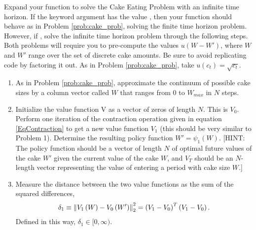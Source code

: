 \begin{problem}
Expand your  function to solve the Cake Eating Problem with an infinite time horizon. If the keyword argument
 has the value , then your function should behave as in Problem \ref{prob:cake_prob}, solving the finite
time horizon problem. However, if , solve the infinite time horizon problem through the following steps.
Both problems will require you to pre-compute the values $u(W - W')$, where $W$ and $W'$ range over the set of discrete cake
amounts. Be sure to avoid replicating code by factoring it out.
As in Problem \ref{prob:cake_prob}, take $u(c_t) = \sqrt{c_t}$.
\begin{enumerate}
\item As in Problem \ref{prob:cake_prob}, approximate the continuum of possible
cake sizes by a column vector called $W$ that ranges from 0 to $W_{max}$ in $N$ steps.

\item \label{item:step2} Initialize the value function V as a vector of zeros of length $N$.  This is $V_0$.  Perform one iteration
of the contraction operation given in equation \eqref{EqContraction} to get a new value function $V_1$ (this should be very similar
to Problem 1).  Determine the resulting policy function $W' = \psi_1\left(W\right)$.  [HINT: The policy function should be a vector
of length $N$ of optimal future values of the cake $W'$ given the current value of the cake $W$, and $V_T$ should be an $N$-length
vector representing the value of entering a period with cake size $W$.]

\item \label{item:step3} Measure the distance between the two value functions as the sum of the
squared differences,
\begin{equation}
\label{EqDist}
\delta_1\equiv \left\lVert V_1\left(W\right) - V_0\left(W'\right)\right\rVert_2^2 = \left(V_1 - V_0\right)^T\left(V_1 - V_0\right).
\end{equation}
Defined in this way, $\delta_1\in [0,\infty)$.

%


\end{enumerate}
\end{problem}
